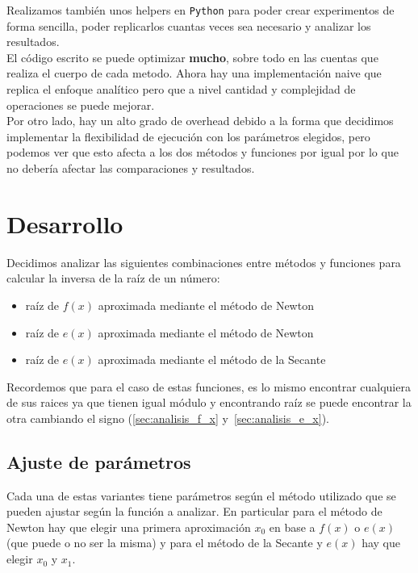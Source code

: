 Realizamos también unos helpers en \verb|Python| para poder crear experimentos
de forma sencilla, poder replicarlos cuantas veces sea necesario y analizar
los resultados.\\

El código escrito se puede optimizar \textbf{mucho}, sobre todo en las cuentas
que realiza el cuerpo de cada metodo. Ahora hay una implementación naive que
replica el enfoque analítico pero que a nivel cantidad y complejidad de
operaciones se puede mejorar.\\

Por otro lado, hay un alto grado de overhead debido a la forma que decidimos
implementar la flexibilidad de ejecución con los parámetros elegidos, pero
podemos ver que esto afecta a los dos métodos y funciones por igual por lo que
no debería afectar las comparaciones y resultados.

\newpage
\section{Desarrollo}

Decidimos analizar las siguientes combinaciones entre métodos y funciones para
calcular la inversa de la raíz de un número:

\begin{itemize}
    \item raíz de $f(x)$ aproximada mediante el método de Newton
    \item raíz de $e(x)$ aproximada mediante el método de Newton
    \item raíz de $e(x)$ aproximada mediante el método de la Secante
\end{itemize}

Recordemos que para el caso de estas funciones, es lo mismo encontrar
cualquiera de sus raices ya que tienen igual módulo y encontrando raíz se puede
encontrar la otra cambiando el signo (\ref{sec:analisis_f_x}
y~\ref{sec:analisis_e_x}).

\subsection{Ajuste de parámetros}

Cada una de estas variantes tiene parámetros según el método utilizado que se
pueden ajustar según la función a analizar. En particular para el método de
Newton hay que elegir una primera aproximación $x_0$ en base a $f(x)$ o $e(x)$
(que puede o no ser la misma) y para el método de la Secante y $e(x)$ hay que
elegir $x_0$ y $x_1$.

